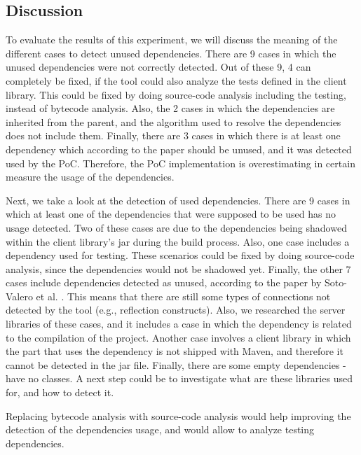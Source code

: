 \subsection{Discussion}
To evaluate the results of this experiment, we will discuss the meaning of the different cases to detect unused dependencies. There are 9 cases in which the unused dependencies were not correctly detected. Out of these 9, 4 can completely be fixed, if the tool could also analyze the tests defined in the client library. This could be fixed by doing source-code analysis including the testing, instead of bytecode analysis. Also, the 2 cases in which the dependencies are inherited from the parent, and the algorithm used to resolve the dependencies does not include them. Finally, there are 3 cases in which there is at least one dependency which according to the paper should be unused, and it was detected used by the PoC. Therefore, the PoC implementation is overestimating in certain measure the usage of the dependencies.

Next, we take a look at the detection of used dependencies. There are 9 cases in which at least one of the dependencies that were supposed to be used has no usage detected. Two of these cases are due to the dependencies being shadowed within the client library's jar during the build process. Also, one case includes a dependency used for testing. These scenarios could be fixed by doing source-code analysis, since the dependencies would not be shadowed yet. Finally, the other 7 cases include dependencies detected as unused, according to the paper by Soto-Valero et al. \cite{soto2020comprehensive}. This means that there are still some types of connections not detected by the tool (e.g., reflection constructs). Also, we researched the server libraries of these cases, and it includes a case in which the dependency is related to the compilation of the project. Another case involves a client library in which the part that uses the dependency is not shipped with Maven, and therefore it cannot be detected in the jar file. Finally, there are some empty dependencies - have no classes. A next step could be to investigate what are these libraries used for, and how to detect it.

\begin{finding}
	Replacing bytecode analysis with source-code analysis would help improving the detection of the dependencies usage, and would allow to analyze testing dependencies.
	\label{find:source-code-analysis}
\end{finding}

